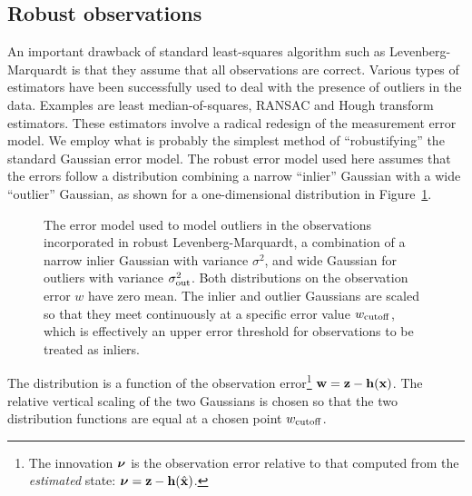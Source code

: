 \documentclass{article}
\begin{document}
\subsection{Robust observations}
An important drawback of standard least-squares algorithm such as
Levenberg-Marquardt is that they assume that all observations are correct.
Various types of estimators have been successfully used to deal with
the presence of outliers in the data.
Examples are least median-of-squares, RANSAC and Hough transform estimators.
These estimators involve a radical redesign of the measurement error model.
We employ what is probably
the simplest method of ``robustifying'' the standard Gaussian error model.
The robust error model used here assumes that the errors follow a
distribution combining a narrow ``inlier'' Gaussian with a wide ``outlier''
Gaussian, as shown for a one-dimensional distribution in
Figure~\ref{gauss_mix}.
\begin{figure}
 \centerline{}
  \caption{The error model used to model outliers in the observations
	incorporated in robust Levenberg-Marquardt,
	a combination of a narrow inlier Gaussian with
	variance $\sigma^2$, and wide Gaussian for outliers with
	variance $\sigma_{\rm out}^2$. Both distributions on the
	observation error $w$ have zero mean. The inlier and outlier
	Gaussians are scaled so that they meet continuously at a specific
	error value $w_{\rm cutoff}$, which is effectively an upper error
	threshold for observations to be treated as inliers.}
 \label{gauss_mix}
\end{figure}
The distribution is a function of the observation error\footnote{The innovation
$\mbox{\boldmath $\nu$}$ is the observation error relative to that computed from the
{\em estimated} state: $\mbox{\boldmath $\nu$} = {\bf z} - {\bf h}(\hat{\bf x})$.}
${\bf w} = {\bf z} - {\bf h}({\bf x})$.
The relative vertical scaling of the two Gaussians is chosen so that the
two distribution functions are equal at a chosen point $w_{\rm cutoff}$.
\end{document}
